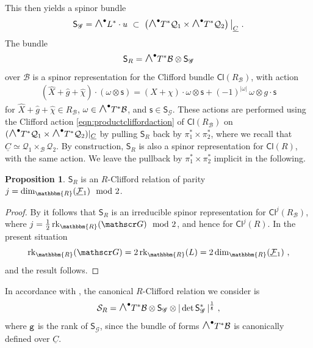 \documentclass[a4paper, reqno, 11pt]{amsart}
\numberwithin{equation}{section}
\theoremstyle{definition}
\newtheorem{proposition}[equation]{Proposition}
\newcommand{\red}[1]{\underline{#1}}
\newcommand{\IR}{\mathbbm{R}}
\newcommand{\Cl}{\mathsf{Cl}}
\newcommand{\cS}{{\mathcal S}}
\newcommand{\cB}{{\mathcal B}}
\newcommand{\cQ}{{\mathcal Q}}
\newcommand{\cF}{{\mathcal F}}
\newcommand{\ccG}{{\mathscr G}}
\newcommand{\sfS}{{\mathsf{S}}}
\newcommand{\sfs}{{\mathsf{s}}}
\newcommand{\midwedge}{\text {\Large$\wedge$}}
\newcommand{\rk}{\mathrm{rk}}
\theoremstyle{remark}
\begin{document}
This then yields a spinor bundle $$\sfS_\ccG = \midwedge^\bullet L^* \cdot u \ \subset \ \left(\midwedge^\bullet T^* \cQ_1 \times \midwedge^\bullet T^* \cQ_2\right)\big\rvert_{\red C} \ . $$ The bundle
\begin{align}\label{eqn:Tdualityrelspinrep}
    \sfS_R = \midwedge^\bullet T^*\cB \otimes \sfS_\ccG 
\end{align}
over $\cB$ is a spinor representation for the Clifford bundle $\Cl(R_\cB)$, with action
\begin{align}
    (\widehat X + \widehat g + \widehat\chi) \cdot (\omega \otimes \sfs) = (X+\chi) \cdot \omega \otimes  \sfs + (-1)^{|\omega|}\,\omega \otimes g\cdot \sfs
\end{align}
for $\widehat X + \widehat g + \widehat\chi \in R_\cB$, $\omega \in \midwedge^\bullet T^*\cB$, and $\sfs \in \sfS_\ccG$. These actions are performed using the Clifford action \eqref{eqn:productcliffordaction} of $\Cl(R_\cB)$ on $(\midwedge^\bullet T^*\cQ_1 \times \midwedge^\bullet T^* \cQ_2) \rvert_{\red C}$ by pulling $\sfS_R$ back by $\pi_1^*\times \pi_2^*$, where we recall that $\red C \simeq \cQ_1 \times_\cB \cQ_2$. By construction, $\sfS_R$ is also a spinor representation for $\Cl(R)$, with the same action. We leave the pullback by $\pi_1^*\times \pi_2^*$ implicit in the following.

\begin{proposition}
    $\sfS_R$ is an $R$-Clifford relation of parity $j= \dim_\IR (\red\cF{}_1) \mod 2$.
\end{proposition}

\begin{proof}
    By \cite[Remark 57]{Cortes:2019roa} it follows that $\sfS_R$ is an irreducible spinor representation for $\Cl^j(R_\cB)$, where $j=\frac12\,\rk_\IR(\ccG)\mod 2$, and hence for $\Cl^j(R)$. In the present situation $$\rk_\IR(\ccG)=2\,\rk_\IR(L)=2\dim_\IR(\red\cF{}_1) \ , $$
    and the result follows.
\end{proof}

In accordance with \cite{Cortes:2021aab}, the canonical $R$-Clifford relation we consider is $$\cS_R = \midwedge^\bullet T^*\cB \otimes \sfS_\ccG \otimes |\det\sfS_\ccG^*\,|^{\frac1{\tt g}} \ , $$ where $\tt g$ is the rank of $\sfS_\ccG$, since the bundle of forms $\midwedge^\bullet T^*\cB$ is canonically defined over $\red C$.
\end{document}
